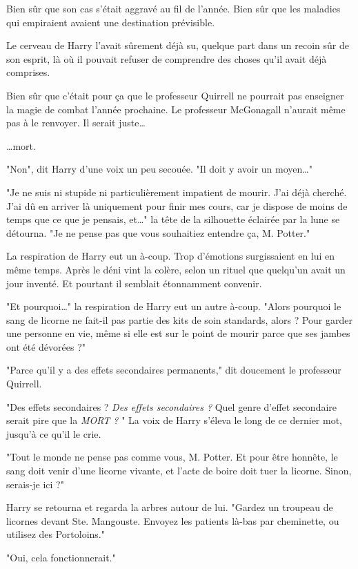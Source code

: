 Bien sûr que son cas s'était aggravé au fil de l'année. Bien sûr que les maladies qui empiraient avaient une destination prévisible.

Le cerveau de Harry l'avait sûrement déjà su, quelque part dans un recoin sûr de son esprit, là où il pouvait refuser de comprendre des choses qu'il avait déjà comprises.

Bien sûr que c'était pour ça que le professeur Quirrell ne pourrait pas enseigner la magie de combat l'année prochaine. Le professeur McGonagall n'aurait même pas à le renvoyer. Il serait juste…

…mort.

"Non", dit Harry d'une voix un peu secouée. "Il doit y avoir un moyen…"

"Je ne suis ni stupide ni particulièrement impatient de mourir. J'ai déjà cherché. J'ai dû en arriver là uniquement pour finir mes cours, car je dispose de moins de temps que ce que je pensais, et…" la tête de la silhouette éclairée par la lune se détourna. "Je ne pense pas que vous souhaitiez entendre ça, M. Potter."

La respiration de Harry eut un à-coup. Trop d'émotions surgissaient en lui en même temps. Après le déni vint la colère, selon un rituel que quelqu'un avait un jour inventé. Et pourtant il semblait étonnamment convenir.

"Et pourquoi…" la respiration de Harry eut un autre à-coup. "Alors pourquoi le sang de licorne ne fait-il pas partie des kits de soin standards, alors ? Pour garder une personne en vie, même si elle est sur le point de mourir parce que ses jambes ont été dévorées ?"

"Parce qu'il y a des effets secondaires permanents," dit doucement le professeur Quirrell.

"Des effets secondaires ? \emph{Des effets secondaires ?}  Quel genre d'effet secondaire serait pire que la \emph{MORT ?} " La voix de Harry s'éleva le long de ce dernier mot, jusqu'à ce qu'il le crie.

"Tout le monde ne pense pas comme vous, M. Potter. Et pour être honnête, le sang doit venir d'une licorne vivante, et l'acte de boire doit tuer la licorne. Sinon, serais-je ici ?"

Harry se retourna et regarda la arbres autour de lui. "Gardez un troupeau de licornes devant Ste. Mangouste. Envoyez les patients là-bas par cheminette, ou utilisez des Portoloins."

"Oui, cela fonctionnerait."

